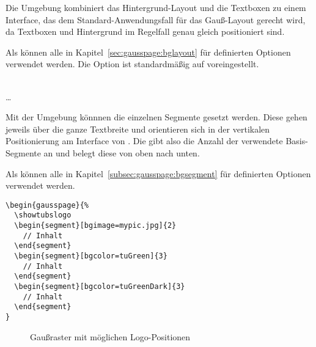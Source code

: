 Die Umgebung  kombiniert das Hintergrund-Layout
und die Textboxen zu einem Interface, das dem Standard-Anwendungsfall für
das Gauß-Layout gerecht wird, da Textboxen und Hintergrund im Regelfall
genau gleich positioniert sind.

Als  können alle in Kapitel~\ref{sec:gausspage:bglayout}
für  definierten Optionen verwendet werden.
Die Option  ist standardmäßig auf 
voreingestellt.

\begin{Declaration}
    \\
  \quad\dots\\
\end{Declaration}

Mit der Umgebung  könnnen die einzelnen
Segmente gesetzt werden.
Diese gehen jeweils über die ganze Textbreite und orientieren sich
in der vertikalen Positionierung am Interface von .
Die  gibt also die Anzahl der verwendete Basis-Segmente an
und belegt diese von oben nach unten.

Als  können alle in Kapitel~\ref{subsec:gausspage:bgsegment}
für  definierten Optionen verwendet werden. %


\begin{lstlisting}[captionpos=b,caption={Beispiel-Nutzung von gausspage}]
\begin{gausspage}{%
  \showtubslogo
  \begin{segment}[bgimage=mypic.jpg]{2}
    // Inhalt
  \end{segment}
  \begin{segment}[bgcolor=tuGreen]{3}
    // Inhalt
  \end{segment}
  \begin{segment}[bgcolor=tuGreenDark]{3}
    // Inhalt
  \end{segment}
}
\end{lstlisting}

\begin{figure}\centering
  \begin{minipage}{0.35\textwidth}
    \label{fig:gausspage:topsender}
  \end{minipage}
  \quad
  \begin{minipage}{0.35\textwidth}
    \label{fig:gausspage:bottomsender}
  \end{minipage}
  \caption{Gaußraster mit möglichen Logo-Positionen}\label{fig:gausspage}
\end{figure}

